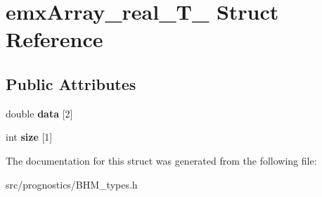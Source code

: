 \hypertarget{structemxArray__real__T__2}{}\section{emx\+Array\+\_\+real\+\_\+\+T\+\_ Struct Reference}
\label{structemxArray__real__T__2}
\subsection*{Public Attributes}
\begin{DoxyCompactItemize}
\item 
\mbox{\label{structemxArray__real__T__2_a68543b5571fe31ceef1604568e0d03f6}} 
double {\bfseries data} \mbox{[}2\mbox{]}
\item 
\mbox{\label{structemxArray__real__T__2_a407927a51c6c1daa3e36f79d4d95909c}} 
int {\bfseries size} \mbox{[}1\mbox{]}
\end{DoxyCompactItemize}


The documentation for this struct was generated from the following file\+:\begin{DoxyCompactItemize}
\item 
src/prognostics/B\+H\+M\+\_\+types.\+h\end{DoxyCompactItemize}

